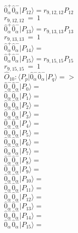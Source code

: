 \documentclass[14pt]{article}
\begin{document}
    $ \hat{0}_{\alpha}^{+}\hat{0}_{\alpha}^{-} \vert{P_{12}}\rangle = {r}_{9,12,12}P_{12} $ \\ 
    ${r}_{9,12,12}\ =\ 1 $ \\ 
    $ \hat{0}_{\alpha}^{+}\hat{0}_{\alpha}^{-} \vert{P_{13}}\rangle = {r}_{9,13,13}P_{13} $ \\ 
    ${r}_{9,13,13}\ =\ 1 $ \\ 
    $ \hat{0}_{\alpha}^{+}\hat{0}_{\alpha}^{-} \vert{P_{14}}\rangle =  $ \\ 
    $ \hat{0}_{\alpha}^{+}\hat{0}_{\alpha}^{-} \vert{P_{15}}\rangle = {r}_{9,15,15}P_{15} $ \\ 
    ${r}_{9,15,15}\ =\ 1 $ \\ 
    
    $\hat{O}_{10}:  \langle{P_p}\vert \hat{0}_{\alpha}^{-}\hat{0}_{\alpha}^{-} \vert{P_q}\rangle => $ \\ 
    $ \hat{0}_{\alpha}^{-}\hat{0}_{\alpha}^{-} \vert{P_{0}}\rangle =  $ \\ 
    $ \hat{0}_{\alpha}^{-}\hat{0}_{\alpha}^{-} \vert{P_{1}}\rangle =  $ \\ 
    $ \hat{0}_{\alpha}^{-}\hat{0}_{\alpha}^{-} \vert{P_{2}}\rangle =  $ \\ 
    $ \hat{0}_{\alpha}^{-}\hat{0}_{\alpha}^{-} \vert{P_{3}}\rangle =  $ \\ 
    $ \hat{0}_{\alpha}^{-}\hat{0}_{\alpha}^{-} \vert{P_{4}}\rangle =  $ \\ 
    $ \hat{0}_{\alpha}^{-}\hat{0}_{\alpha}^{-} \vert{P_{5}}\rangle =  $ \\ 
    $ \hat{0}_{\alpha}^{-}\hat{0}_{\alpha}^{-} \vert{P_{6}}\rangle =  $ \\ 
    $ \hat{0}_{\alpha}^{-}\hat{0}_{\alpha}^{-} \vert{P_{7}}\rangle =  $ \\ 
    $ \hat{0}_{\alpha}^{-}\hat{0}_{\alpha}^{-} \vert{P_{8}}\rangle =  $ \\ 
    $ \hat{0}_{\alpha}^{-}\hat{0}_{\alpha}^{-} \vert{P_{9}}\rangle =  $ \\ 
    $ \hat{0}_{\alpha}^{-}\hat{0}_{\alpha}^{-} \vert{P_{10}}\rangle =  $ \\ 
    $ \hat{0}_{\alpha}^{-}\hat{0}_{\alpha}^{-} \vert{P_{11}}\rangle =  $ \\ 
    $ \hat{0}_{\alpha}^{-}\hat{0}_{\alpha}^{-} \vert{P_{12}}\rangle =  $ \\ 
    $ \hat{0}_{\alpha}^{-}\hat{0}_{\alpha}^{-} \vert{P_{13}}\rangle =  $ \\ 
    $ \hat{0}_{\alpha}^{-}\hat{0}_{\alpha}^{-} \vert{P_{14}}\rangle =  $ \\ 
    $ \hat{0}_{\alpha}^{-}\hat{0}_{\alpha}^{-} \vert{P_{15}}\rangle =  $ \\ 
    
\end{document}
